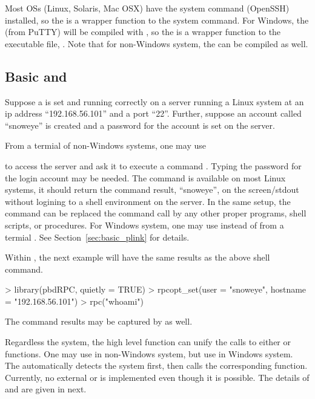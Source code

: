 Most OSs (Linux, Solaris, Mac OSX) have the system command  (OpenSSH)
installed, so the
 is a wrapper function to the system  command.
For Windows, the  (from PuTTY) will be compiled with
, so the  is a wrapper function to the
executable file, .
Note that for non-Windows system, the  can be compiled as well.


\subsection[Basic \code{ssh} and \code{rpc()}]{Basic  and }
\label{sec:basic_rpc}

Suppose a  is set and running correctly on a server running a Linux
system at an ip address ``192.168.56.101'' and a port ``22''.
Further, suppose an account
called ``snoweye'' is created and a password for the account is set on
the server.

From a termial of non-Windows systems, one may use
to access the server and ask it to execute a command .
Typing the password for the login account may be needed.
The command  is available on most Linux systems, it should
return the command result, ``snoweye'', on the screen/stdout without
logining to a shell environment on the server.
In the same setup, the command can be replaced the command call
by any other proper programs, shell scripts, or procedures.
For Windows system, one may use  instead of 
from a termial . See Section~\ref{sec:basic_plink} for details.

Within , the next example will have the
same results as the above shell command.
\begin{Code}[title=Basic \code{rpc()} in \pkg{pbdRPC} and \proglang{R}]
> library(pbdRPC, quietly = TRUE)
> rpcopt_set(user = "snoweye", hostname = "192.168.56.101")
> rpc("whoami")
\end{Code}
The command results may be captured by  as well.

Regardless the system,
the high level function  can unify the calls to
either  or  functions.
One may use  in non-Windows system, but
use  in Windows system.
The  automatically
detects the system first, then calls the corresponding function.
Currently, no external  or  is implemented
even though it is possible.
The details of  and  are given in next.


